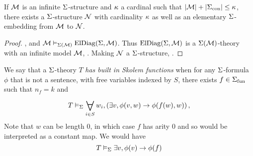 \begin{prop}
    If $\mathcal{M}$ is an infinite $\Sigma$-structure 
    and $\kappa$ a cardinal such that 
    $|{\mathcal{M}}|+ |{\Sigma}_\mathrm{con}| \leq \kappa$,
    there exists a $\Sigma$-structure $\mathcal{N}$ with cardinality 
    $\kappa$ as well as an elementary 
    $\Sigma$-embedding from $\mathcal{M}$ to $\mathcal{N}$.
\end{prop}
\begin{proof}
    ,
    and $\mathcal{M} \vDash_{\Sigma(\mathcal{M})} \mathrm{ElDiag}(\Sigma,\mathcal{M})$.
    Thus $\mathrm{ElDiag}(\Sigma,\mathcal{M})$ is a 
    $\Sigma(\mathcal{M})$-theory with an infinite model $\mathcal{M}$,
    .
    Making $\mathcal{N}$ a $\Sigma$-structure, 
    .
\end{proof}

\begin{dfn}
    We say that a $\Sigma$-theory $T$ 
    \emph{has built in Skolem functions} when for any $\Sigma$-formula $\phi$
    that is not a sentence, 
    with free variables indexed by $S$,
    there exists $f \in {\Sigma}_\mathrm{fun}$ such that $n_f = k$ and 
    \[T \model{\Si} \bigforall{i \in S}{} w_i, 
        \brkt{\exists v, \phi(v,w) \to \phi(f(w),w)},\]
    Note that $w$ can be length $0$, 
    in which case $f$ has arity $0$ 
    and so would be interpreted as a constant map.
    We would have 
    \[T \vDash_{\Sigma}  
        \exists v, \phi(v) \to \phi(f)\]
\end{dfn}

